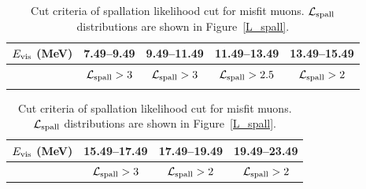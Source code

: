 \begin{table}[p]
	\centering
	\caption[Cut criteria of spallation likelihood cut for misfit muons]{
	Cut criteria of spallation likelihood cut for misfit muons.
	$\mathcal{L}_{\rm spall}$ distributions are shown in Figure~\ref{L_spall}.
	}\label{tab:cut_misfit}
	\vs
	\begin{tabular}{ccccc} \hline \hline
		$E_{\rm vis}$ (MeV) & 7.49--9.49                    & 9.49--11.49                   & 11.49--13.49                    & 13.49--15.49                  \\ \hline
		                    & $\mathcal{L}_{\rm spall} > 3$ & $\mathcal{L}_{\rm spall} > 3$ & $\mathcal{L}_{\rm spall} > 2.5$ & $\mathcal{L}_{\rm spall} > 2$ \\ \hline \hline
		                    &                               &                               &                                 &
	\end{tabular}
	\begin{tabular}{cccc} \hline \hline
		$E_{\rm vis}$ (MeV) & 15.49--17.49                  & 17.49--19.49                  & 19.49--23.49                  \\ \hline
		                    & $\mathcal{L}_{\rm spall} > 3$ & $\mathcal{L}_{\rm spall} > 2$ & $\mathcal{L}_{\rm spall} > 2$ \\ \hline \hline
	\end{tabular}
\end{table}

